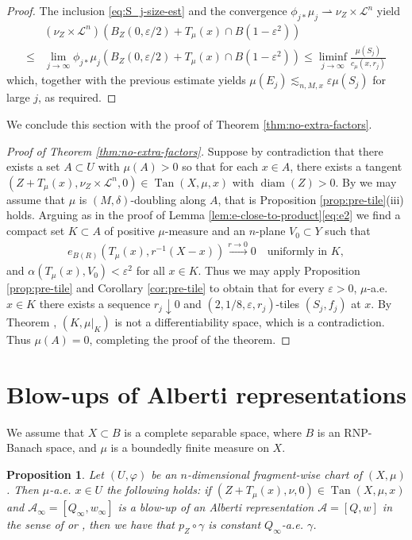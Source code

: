 \documentclass{amsart}
\newtheorem{proposition}[theorem]{Proposition}
\numberwithin{equation}{section}
\newcommand{\leb}{\mathcal{L}}
\newcommand{\diam}{\operatorname{diam}}
\newcommand{\inv}{^{-1}}
\newcommand{\Tan}{\operatorname{Tan}}
\begin{document}
\begin{proof}
The inclusion \eqref{eq:S_j-size-est} and the convergence $\phi_{j\ast}\mu_j\rightharpoonup \nu_Z\times\leb^n$ yield
\begin{align*}
&(\nu_Z\times\leb^n)( B_Z(0,\varepsilon/2)+T_\mu(x)\cap  B(1-\varepsilon^2))\\
\le &\lim_{j\to\infty}\phi_{j\ast}\mu_j(B_Z(0,\varepsilon/2)+T_\mu(x)\cap  B(1-\varepsilon^2))\le\liminf_{j\to\infty}\frac{\mu(S_j)}{c_\mu(x,r_j)}
\end{align*}
which, together with the previous estimate yields $\mu(E_j)\lesssim_{n,M,x} \varepsilon \mu(S_j)$ for large $j$, as required.
\end{proof}

We conclude this section with the proof of Theorem \ref{thm:no-extra-factors}.

\begin{proof}[Proof of Theorem \ref{thm:no-extra-factors}]
Suppose by contradiction that there exists a set $A\subset U$ with $\mu(A)>0$ so that for each $x\in A$, there exists a tangent $(Z+T_\mu(x),\nu_Z\times\leb^n,0)\in \Tan(X,\mu,x)$ with $\diam(Z)>0$.  By \cite[Lemma 2.2. and 2.3]{bateli} we may assume that $\mu$ is $(M,\delta)$-doubling along $A$, that is Proposition \ref{prop:pre-tile}(iii) holds. Arguing as in the proof of Lemma \ref{lem:e-close-to-product}\eqref{eq:e2} we find a compact set $K\subset A$ of positive $\mu$-measure and an $n$-plane $V_0\subset Y$ such that
\begin{align*}
    e_{B(R)}(T_\mu(x),r\inv(X-x))\stackrel{r\to 0}{\longrightarrow} 0\quad\mbox{uniformly in }K,
\end{align*}
and $\alpha(T_\mu(x),V_0)<\varepsilon^2$ for all $x\in K$. Thus we may apply Proposition \ref{prop:pre-tile} and Corollary \ref{cor:pre-tile} to obtain that for every $\varepsilon>0$, $\mu$-a.e. $x\in K$ there exists a sequence $r_j\downarrow 0$ and $(2,1/8,\varepsilon,r_j)$-tiles $(S_j,f_j)$ at $x$. By Theorem \cite[Theorem 4.1 and Theorem 4.3]{sch16a}, $(K,\mu|_K)$ is not a differentiability space, which is a contradiction. Thus $\mu(A)=0$, completing the proof of the theorem.
\end{proof}

\appendix
\section{Blow-ups of Alberti representations}
We assume that $X\subset B$ is a complete separable space, where $B$ is an RNP-Banach space, and $\mu$ is a boundedly finite measure on $X$.
\begin{proposition}\label{prop:const z-component}
Let $(U,\varphi)$ be an $n$-dimensional fragment-wise chart of $(X,\mu)$. Then $\mu$-a.e. $x\in U$ the following holds: if $(Z+T_\mu(x),\nu,0)\in \Tan(X,\mu,x)$ and $\mathcal A_\infty=[Q_\infty,w_\infty]$ is a blow-up of an Alberti representation $\mathcal A=[Q,w]$ in the sense of \cite[Theorem 7.18]{CKS} or \cite[Theorem 3.11 and Corollary 3.14]{sch16a}, then we have that $p_Z\circ\gamma$ is constant $Q_\infty$-a.e. $\gamma$.
\end{proposition}
\end{document}
